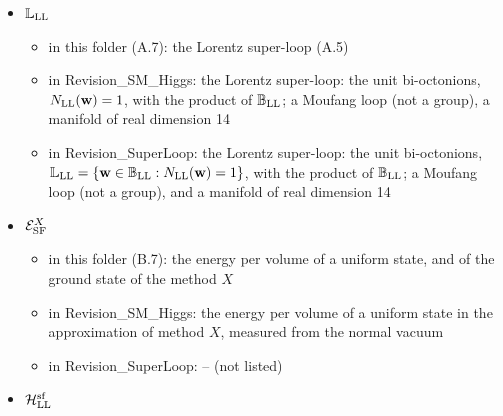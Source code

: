 \documentclass[
  10pt,
]{article}
\providecommand{\tightlist}{%
  \setlength{\itemsep}{0pt}\setlength{\parskip}{0pt}}
\begin{document}
\begin{itemize}
  \begin{itemize}
  \tightlist
  \item
    in this folder (A.7, D): the \(2\times2\) matrix of a bi-quaternion
    (9.1)
  \item
    in Revision\_SM\_Higgs: the complex \(2\times2\) matrix of a
    bi-quaternion, \(M_{\rm LL}(\mathbf e_0)=\sigma^{\rm LL}_0\),
    \(M_{\rm LL}(\mathbf e_j)=-i\sigma^{\rm LL}_j\), extended
    complex-linearly;
    \(M_{\rm LL}(\mathbf b\mathbf b')=M_{\rm LL}(\mathbf b)M_{\rm LL}(\mathbf b')\)
    and \(\det M_{\rm LL}(\mathbf b)=N_{\rm LL}(\mathbf b)\)
  \item
    in Revision\_SuperLoop: the complex \(2\times2\) matrix of a
    bi-quaternion, \(M_{\rm LL}(\mathbf e_0)=\sigma^{\rm LL}_0\),
    \(M_{\rm LL}(\mathbf e_j)=-i\sigma^{\rm LL}_j\), extended
    complex-linearly;
    \(M_{\rm LL}(\mathbf b\mathbf b')=M_{\rm LL}(\mathbf b)M_{\rm LL}(\mathbf b')\),
    \(\det M_{\rm LL}(\mathbf b)=N_{\rm LL}(\mathbf b)\) (plain text
    \texttt{M\_2(C)}: all complex \(2\times2\) matrices)
  \end{itemize}
\item
  \(\mathbb L_{\rm LL}\)

  \begin{itemize}
  \tightlist
  \item
    in this folder (A.7): the Lorentz super-loop (A.5)
  \item
    in Revision\_SM\_Higgs: the Lorentz super-loop: the unit
    bi-octonions, \(N_{\rm LL}(\mathbf w)=1\), with the product of
    \(\mathbb B_{\rm LL}\); a Moufang loop (not a group), a manifold of
    real dimension 14
  \item
    in Revision\_SuperLoop: the Lorentz super-loop: the unit
    bi-octonions,
    \(\mathbb L_{\rm LL}=\{\mathbf w\in\mathbb B_{\rm LL}:N_{\rm LL}(\mathbf w)=1\}\),
    with the product of \(\mathbb B_{\rm LL}\); a Moufang loop (not a
    group), and a manifold of real dimension 14
  \end{itemize}
\item
  \(\mathcal E^X_{\rm SF}\)

  \begin{itemize}
  \tightlist
  \item
    in this folder (B.7): the energy per volume of a uniform state, and
    of the ground state of the method \(X\)
  \item
    in Revision\_SM\_Higgs: the energy per volume of a uniform state in
    the approximation of method \(X\), measured from the normal vacuum
  \item
    in Revision\_SuperLoop: -- (not listed)
  \end{itemize}
\item
  \(\mathcal H^{\rm sf}_{\rm LL}\)


\end{itemize}
\end{document}

